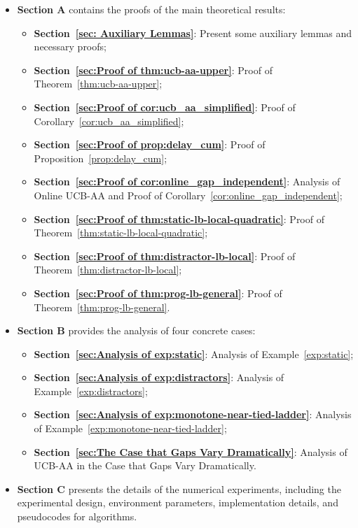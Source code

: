 \documentclass[11pt]{article}
\begin{document}
\begin{itemize}
    \item \textbf{Section A} contains the proofs of the main theoretical results:
    \begin{itemize}
        \item \textbf{Section~\ref{sec: Auxiliary Lemmas}}: Present some auxiliary lemmas and necessary proofs;
        \item \textbf{Section~\ref{sec:Proof of thm:ucb-aa-upper}}: Proof of Theorem~\ref{thm:ucb-aa-upper};
        \item \textbf{Section~\ref{sec:Proof of cor:ucb_aa_simplified}}: Proof of Corollary~\ref{cor:ucb_aa_simplified};
        \item \textbf{Section~\ref{sec:Proof of prop:delay_cum}}: Proof of Proposition~\ref{prop:delay_cum};
        \item \textbf{Section~\ref{sec:Proof of cor:online_gap_independent}}: Analysis of Online UCB-AA and Proof of Corollary~\ref{cor:online_gap_independent};
        \item \textbf{Section~\ref{sec:Proof of thm:static-lb-local-quadratic}}: Proof of 
        Theorem~\ref{thm:static-lb-local-quadratic};
        \item  \textbf{Section~\ref{sec:Proof of thm:distractor-lb-local}}: Proof of Theorem~\ref{thm:distractor-lb-local};
        \item  \textbf{Section~\ref{sec:Proof of thm:prog-lb-general}}: Proof of Theorem~\ref{thm:prog-lb-general}.
    \end{itemize}
    
    \item \textbf{Section B} provides the analysis of four concrete cases:
    \begin{itemize}
        \item \textbf{Section~\ref{sec:Analysis of exp:static}}: Analysis of Example~\ref{exp:static};
        \item \textbf{Section~\ref{sec:Analysis of exp:distractors}}: Analysis of Example~\ref{exp:distractors};
        \item \textbf{Section~\ref{sec:Analysis of exp:monotone-near-tied-ladder}}: Analysis of Example~\ref{exp:monotone-near-tied-ladder};
        \item \textbf{Section~\ref{sec:The Case that Gaps Vary Dramatically}}: Analysis of UCB-AA in the Case that Gaps Vary Dramatically.
    \end{itemize}
    
    \item \textbf{Section C} presents the details of the numerical experiments, including the experimental design, environment parameters, implementation details, and pseudocodes for algorithms.
\end{itemize}
\end{document}
